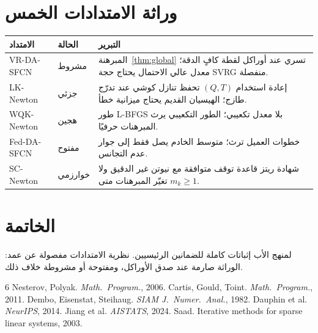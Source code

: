 \documentclass[12pt,a4paper]{article}
\theoremstyle{definition}
\begin{document}
\section{وراثة الامتدادات الخمس}
\begin{center}
\begin{tabular}{@{}llp{6.8cm}@{}}
\toprule
الامتداد & الحالة & التبرير \\
\midrule
\textenglish{VR-DA-SFCN} & مشروط & المبرهنة~\ref{thm:global} تسري عند أوراكل
لقطة كافٍ الدقة؛ معدل عالي الاحتمال يحتاج حجة \textenglish{SVRG} منفصلة. \\
\textenglish{LK-Newton} & جزئي & إعادة استخدام $(Q,T)$ تحفظ تنازل كوشي عند
تدرّج طازج؛ الهيسيان القديم يحتاج ميزانية خطأ. \\
\textenglish{WQK-Newton} & هجين & طور \textenglish{L-BFGS} بلا معدل تكعيبي؛
الطور التكعيبي يرث المبرهنات حرفيًا. \\
\textenglish{Fed-DA-SFCN} & مفتوح & خطوات العميل ترث؛ متوسط الخادم يصل فقط
إلى جوار عدم التجانس. \\
\textenglish{SC-Newton} & خوارزمي & شهادة ريتز قاعدة توقف متوافقة مع نيوتن
غير الدقيق ولا تغيّر المبرهنات متى $m_k\ge 1$. \\
\bottomrule
\end{tabular}
\end{center}

\section{الخاتمة}
لمنهج الأب إثباتات كاملة للضمانين الرئيسيين. نظرية الامتدادات مفصولة عن
عمد: الوراثة صارمة عند صدق الأوراكل، ومفتوحة أو مشروطة خلاف ذلك.

\begin{english}
\begin{thebibliography}{6}
 Nesterov, Polyak. \textit{Math.\ Program.}, 2006.
 Cartis, Gould, Toint. \textit{Math.\ Program.}, 2011.
 Dembo, Eisenstat, Steihaug. \textit{SIAM J.\ Numer.\ Anal.}, 1982.
 Dauphin et al. \textit{NeurIPS}, 2014.
 Jiang et al. \textit{AISTATS}, 2024.
 Saad. Iterative methods for sparse linear systems, 2003.
\end{thebibliography}
\end{english}
\end{document}
